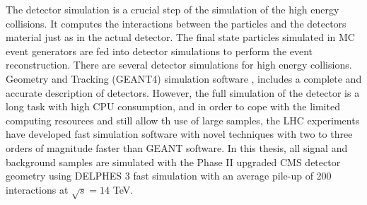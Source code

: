 The detector simulation is a crucial step of the simulation of the high energy collisions. It computes the interactions between the particles and the detectors material just as in the actual detector. The final state particles simulated in MC event generators are fed into detector simulations to perform the event reconstruction. There are several detector simulations for high energy collisions. Geometry and Tracking (GEANT4) simulation software \cite{Agostinelli2003}, includes a complete and accurate description of detectors. However, the full simulation of the detector is a long task with high CPU consumption, and in order to cope with the limited computing resources and still allow th use of large samples, the LHC experiments have developed fast simulation software with novel techniques \cite{Sekmen:2242542, Lukas:2012kua} with two to three orders of magnitude faster than GEANT software. In this thesis, all signal and background samples are simulated with the Phase II upgraded CMS detector geometry using DELPHES 3 fast simulation \cite{Selvaggi:2014mya} with an average pile-up of 200 interactions at $\sqrt{s}=14$ TeV.

